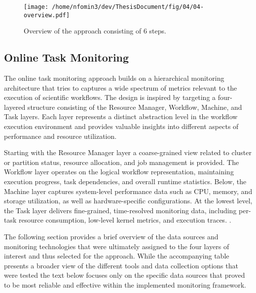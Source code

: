\begin{figure}[htbp]
    \centering
    \texttt{[image: /home/nfomin3/dev/ThesisDocument/fig/04/04-overview.pdf]} %
    \caption{Overview of the approach consisting of 6 steps.}
    \label{fig:approach_overview}
\end{figure}

\subsection{Online Task Monitoring}
\label{sec:online_task_monitoring}

The online task monitoring approach builds on a hierarchical monitoring architecture that tries to captures a wide spectrum of metrics relevant to the execution of scientific workflows. The design is inspired by \cite{Bader_2022} targeting a four-layered structure consisting of the Resource Manager, Workflow, Machine, and Task layers. Each layer represents a distinct abstraction level in the workflow execution environment and provides valuable insights into different aspects of performance and resource utilization.

Starting with the Resource Manager layer a coarse-grained view related to cluster or partition status, resource allocation, and job management is provided. The Workflow layer operates on the logical workflow representation, maintaining execution progress, task dependencies, and overall runtime statistics. Below, the Machine layer captures system-level performance data such as CPU, memory, and storage utilization, as well as hardware-specific configurations. At the lowest level, the Task layer delivers fine-grained, time-resolved monitoring data, including per-task resource consumption, low-level kernel metrics, and execution traces.
\cite{Bader_2022}.

The following section provides a brief overview of the data sources and monitoring technologies that were ultimately assigned to the four layers of interest and thus selected for the approach. While the accompanying table presents a broader view of the different tools and data collection options that were tested the text below focuses only on the specific data sources that proved to be most reliable and effective within the implemented monitoring framework.

